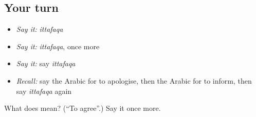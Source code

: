 \subsection*{Your turn}
\begin{itemize}
\raggedright
  \item \emph{Say it:} \emph{ittafaqa}
  \item \emph{Say it:} \emph{ittafaqa}, once more
  \item \emph{Say it:} say \emph{ittafaqa}
  \item \emph{Recall:} say the Arabic for to apologise, then the Arabic for to inform, then say \emph{ittafaqa} again
\end{itemize}

\begin{tcolorbox}[breakable,colback=teal!4,colframe=teal!35!black,title={Before you move on}]
What does  mean? (\textquotedblleft{}To agree\textquotedblright{}.) Say it once more.
\end{tcolorbox}
